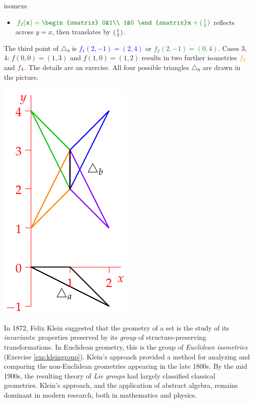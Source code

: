 \begin{examples}{}{isomexs}
\begin{enumerate}
\begin{minipage}[t]{0.75\linewidth}
\begin{itemize}
  	\item $\textcolor{Green}{f_2(\vx)=\begin{smatrix}
  		0&1\\
  		1&0
  	\end{smatrix}\vx+\stwovec 12}$ reflects across $y=x$, then translates by $\left(\begin{smallmatrix}1\\2\end{smallmatrix}\right)$.
  \end{itemize}
  The third point of $\triangle_b$ is \textcolor{blue}{$f_1(2,-1)=(2,4)$} or \textcolor{Green}{$f_2(2,-1)=(0,4)$}.\medbreak
  Cases 3,\,4: $f(0,0)=(1,3)$ and $f(1,0)=(1,2)$ results in two further isometries $\textcolor{orange}{f_3}$ and $\textcolor{Purple}{f_4}$. The details are an exercise.\medbreak
  All four possible triangles $\triangle_b$ are drawn in the picture.
  \end{minipage}\hfill\begin{minipage}[t]{0.24\linewidth}\vspace{-10pt}
  \flushright\includegraphics[scale=0.9]{isom-ex}
  \end{minipage}
\end{enumerate}
\end{examples}



In 1872, Felix Klein suggested that the geometry of a set is the study of its \emph{invariants}: properties preserved by its \emph{group} of structure-preserving transformations. In Euclidean geometry, this is the group of \emph{Euclidean isometries} (Exercise \ref{exs:kleingroup}). Klein's approach provided a method for analyzing and comparing the non-Euclidean geometries appearing in the late 1800s. By the mid 1900s, the resulting theory of \emph{Lie groups} had largely classified classical geometries. Klein's approach, and the application of abstract algebra, remains dominant in modern research, both in mathematics and physics.


